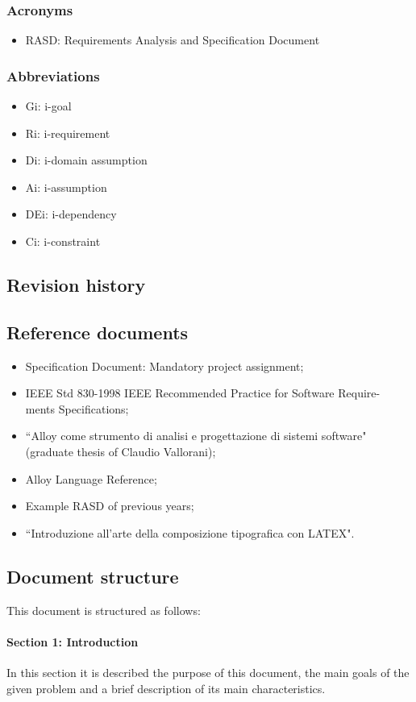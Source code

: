 \documentclass[12pt,titlepage]{article}
\begin{document}
\subsubsection{Acronyms}\label{RASD}
\begin{itemize}
\item	RASD: Requirements Analysis and Specification Document
\end{itemize}
\subsubsection{Abbreviations}\label{RASD}
\begin{itemize}
\item	Gi: i-goal
\item	Ri: i-requirement
\item	Di: i-domain assumption
\item Ai: i-assumption 
\item DEi: i-dependency
\item Ci: i-constraint
\end{itemize}
\subsection{Revision history}\label{RASD}

\subsection{Reference documents}\label{RASD}
\begin{itemize}
\item Specification Document: Mandatory project assignment;
\item IEEE Std 830-1998 IEEE Recommended Practice for Software Require-
ments Specifications;
\item``Alloy come strumento di analisi e progettazione di sistemi software" (graduate thesis of Claudio Vallorani);
\item Alloy Language Reference;
\item Example RASD of previous years;
\item ``Introduzione all'arte della composizione tipografica con LATEX".
\end{itemize}


\subsection{Document structure}\label{RASD}
This document is structured as follows:
\paragraph{Section 1: Introduction}
In this section it is described the purpose of this document, the main goals of the given problem and a brief description of its main characteristics. 
\end{document}
